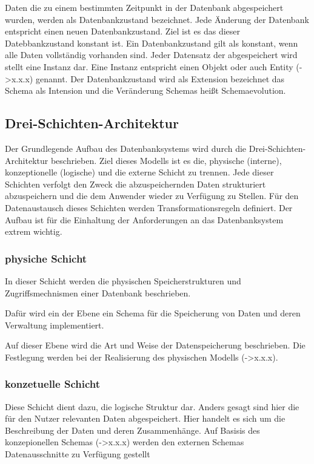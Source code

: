 \begin{flushleft}
Daten die zu einem bestimmten Zeitpunkt in der Datenbank abgespeichert wurden, werden als Datenbankzustand bezeichnet. Jede Änderung der Datenbank entspricht einen neuen Datenbankzustand. Ziel ist es das dieser Datebbankzustand konstant ist. Ein Datenbankzustand gilt als konstant, wenn alle Daten vollständig vorhanden sind. 
Jeder Datensatz der abgespeichert wird stellt eine Instanz dar. Eine Instanz entspricht einen Objekt oder auch Entity (->x.x.x) genannt.
Der Datenbankzustand wird als Extension bezeichnet das Schema als Intension und die Veränderung Schemas heißt Schemaevolution.

\subsection{Drei-Schichten-Architektur}

Der Grundlegende Aufbau des Datenbanksystems wird durch die Drei-Schichten-Architektur beschrieben. Ziel dieses Modells ist es die, physische (interne), konzeptionelle (logische) und die externe Schicht zu trennen. 
Jede dieser Schichten verfolgt den Zweck die abzuspeichernden Daten strukturiert abzuspeichern und die dem Anwender wieder zu Verfügung zu Stellen. Für den Datenaustausch dieses Schichten werden Transformationsregeln definiert. Der Aufbau ist für die Einhaltung der Anforderungen an das Datenbanksystem extrem wichtig. 

\subsubsection{physiche Schicht}

In dieser Schicht werden die physischen Speicherstrukturen und Zugriffsmechnismen einer Datenbank beschrieben.

Dafür wird ein der Ebene ein Schema für die Speicherung von Daten und deren Verwaltung implementiert.

Auf dieser Ebene wird die Art und Weise der Datenspeicherung beschrieben. Die Festlegung werden bei der Realisierung des physischen Modells (->x.x.x).

\subsubsection{konzetuelle Schicht}

Diese Schicht dient dazu, die logische Struktur dar. Anders gesagt sind hier die für den Nutzer relevanten Daten abgespeichert. 
Hier handelt es sich um die Beschreibung der Daten und deren Zusammenhänge. Auf Basisis des konzepionellen Schemas (->x.x.x) werden den externen Schemas Datenausschnitte zu Verfügung gestellt


\end{flushleft}
